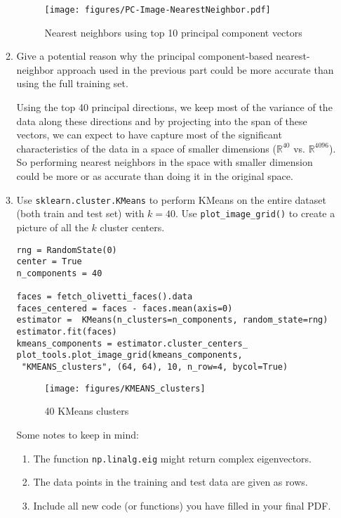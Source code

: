 \documentclass[12pt,twoside]{article}
\begin{document}
\begin{enumerate}
\begin{enumerate}
	\begin{figure}[H]
		\centering
		\texttt{[image: figures/PC-Image-NearestNeighbor.pdf]}
		\caption{Nearest neighbors using top 10 principal component vectors}
		\label{fig8}
	\end{figure}


\item Give a potential reason why the principal component-based 
nearest-neighbor approach used in the previous part could be
more accurate than using the full training set.

Using the top 40 principal directions, we keep most of the variance of the data along these directions and by projecting into the span of these vectors, we can expect to have capture most of the significant characteristics of the data in a space of smaller dimensions ($\mathbb{R}^{40}$ vs. $\mathbb{R}^{4096}$). So performing nearest neighbors in the space with smaller dimension could be more or as accurate than doing it in the original space.
 
\item Use \verb|sklearn.cluster.KMeans| to perform KMeans on the entire dataset (both train and test set) with $k=40$. Use \verb|plot_image_grid()| to create a picture of all the $k$ cluster centers. 

\begin{verbatim} 
rng = RandomState(0)
center = True
n_components = 40

faces = fetch_olivetti_faces().data
faces_centered = faces - faces.mean(axis=0)
estimator =  KMeans(n_clusters=n_components, random_state=rng)
estimator.fit(faces)
kmeans_components = estimator.cluster_centers_
plot_tools.plot_image_grid(kmeans_components,
 "KMEANS_clusters", (64, 64), 10, n_row=4, bycol=True)
\end{verbatim}

	\begin{figure}[H]
		\centering
		\texttt{[image: figures/KMEANS\_clusters]}
		\caption{40 KMeans clusters}
		\label{fig9}
	\end{figure}
	


 Some notes to keep in mind:
  \begin{enumerate}
  \item The function {\tt np.linalg.eig} might return complex eigenvectors.
  \item The data points in the training and test data are given as
    rows.
    \item Include all new code (or functions) you have filled in your final PDF.
 \end{enumerate}
 


	\end{enumerate}
  
\end{enumerate}
\end{document}
